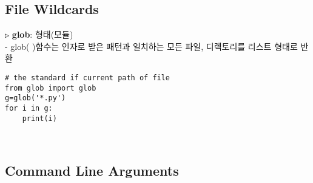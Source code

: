 \documentclass[11pt,a4paper]{article}
\begin{document}
\subsection{\Large\textbf{File Wildcards}}
\begin{spacing}{1.5}
\texttt{▷} \textbf{glob}: 형태(모듈)\\
- glob( )함수는 인자로 받은 패턴과 일치하는 모든 파일, 디렉토리를 리스트 형태로 반환
\begin{lstlisting}[label={list:first}]
# the standard if current path of file
from glob import glob
g=glob('*.py')
for i in g:
    print(i)
\end{lstlisting}
\end{spacing}\\

\subsection{\Large\textbf{Command Line Arguments}}
\end{document}
